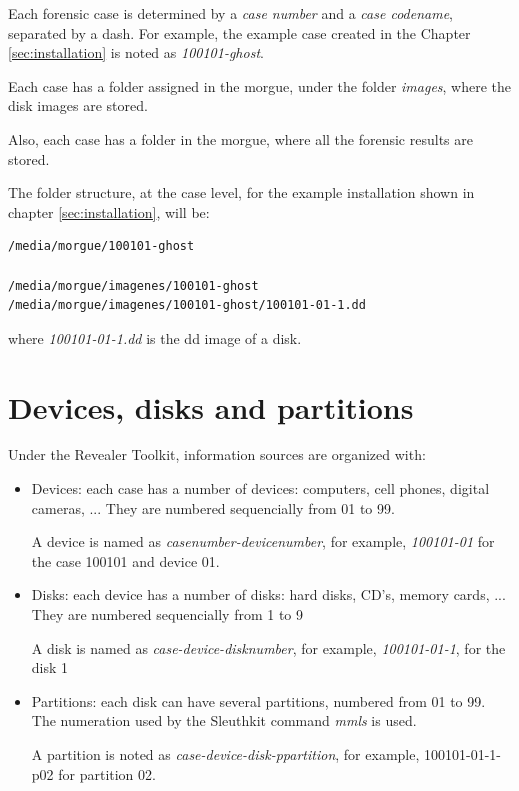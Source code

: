 \documentclass[a4paper,11pt,oneside]{report}
\begin{document}
Each forensic case is determined by a \emph{case number} and a \emph{case codename}, separated by a dash. For example, the example case created in the Chapter \ref{sec:installation} is noted as \emph{100101-ghost}.

Each case has a folder assigned in the morgue, under the folder \emph{images}, where the disk images are stored.

Also, each case has a folder in the morgue, where all the forensic results are stored.

The folder structure, at the case level, for the example installation shown in chapter \ref{sec:installation}, will be:

\begin{verbatim}
/media/morgue/100101-ghost

/media/morgue/imagenes/100101-ghost
/media/morgue/imagenes/100101-ghost/100101-01-1.dd
\end{verbatim}

where \emph{100101-01-1.dd} is the dd image of a disk.


\section{Devices, disks and partitions}

Under the Revealer Toolkit, information sources are organized with:

\begin{itemize}
\item Devices: each case has a number of devices: computers, cell phones, digital cameras, ...   They are numbered sequencially from 01 to 99. 

A device is named as \emph{casenumber-devicenumber}, for example, \emph{100101-01} for the case 100101 and device 01.

\item Disks: each device has a number of disks: hard disks, CD's, memory cards, ... They are numbered sequencially from 1 to 9

A disk is named as \emph{case-device-disknumber}, for example, \emph{100101-01-1}, for the disk 1

\item Partitions:  each disk can have several partitions, numbered from 01 to 99. The numeration used by the Sleuthkit command \emph{mmls} is used.

A partition is noted as \emph{case-device-disk-ppartition}, for example, 100101-01-1-p02 for partition 02.
\end{itemize}
\end{document}
